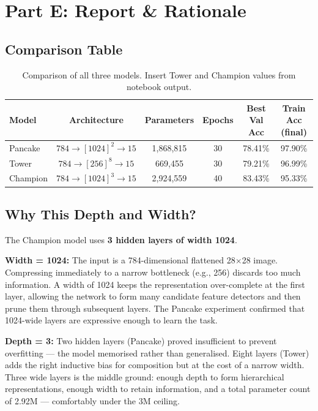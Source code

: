 \documentclass[11pt,a4paper]{article}
\begin{document}
\section{Part E: Report \& Rationale}

\subsection{Comparison Table}

\begin{table}[H]
\centering
\begin{tabular}{lccccc}
\toprule
Model & Architecture & Parameters & Epochs & Best Val Acc & Train Acc (final) \\
\midrule
Pancake  & $784 \to [1024]^2 \to 15$   & 1,868,815 & 30 & 78.41\% & 97.90\% \\
Tower    & $784 \to [256]^8 \to 15$     & 669,455   & 30 & 79.21\% & 96.99\% \\
Champion & $784 \to [1024]^3 \to 15$    & 2,924,559 & 40 & 83.43\% & 95.33\% \\
\bottomrule
\end{tabular}
\caption{Comparison of all three models. Insert Tower and Champion values from notebook output.}
\end{table}

\subsection{Why This Depth and Width?}

The Champion model uses \textbf{3 hidden layers of width 1024}.

\textbf{Width = 1024:} The input is a 784-dimensional flattened 28$\times$28 image. Compressing immediately to a narrow bottleneck (e.g., 256) discards too much information. A width of 1024 keeps the representation over-complete at the first layer, allowing the network to form many candidate feature detectors and then prune them through subsequent layers. The Pancake experiment confirmed that 1024-wide layers are expressive enough to learn the task.

\textbf{Depth = 3:} Two hidden layers (Pancake) proved insufficient to prevent overfitting — the model memorised rather than generalised. Eight layers (Tower) adds the right inductive bias for composition but at the cost of a narrow width. Three wide layers is the middle ground: enough depth to form hierarchical representations, enough width to retain information, and a total parameter count of 2.92M — comfortably under the 3M ceiling.
\end{document}
